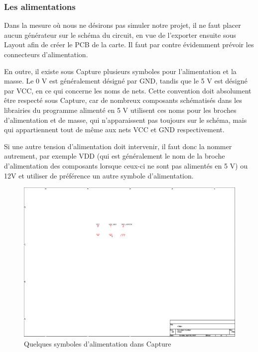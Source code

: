 \documentclass[a4paper]{article}
\begin{document}
\subsubsection{Les alimentations}

Dans la mesure où nous ne désirons pas simuler notre projet, il ne faut placer aucun générateur sur le schéma du circuit, en vue de l'exporter ensuite sous Layout afin de créer le \ac{PCB} de la carte. Il faut par contre évidemment prévoir les connecteurs d'alimentation.

En outre, il existe sous Capture plusieurs symboles pour l'alimentation et la masse. Le 0 V est généralement désigné par GND, tandis que le 5 V est désigné par VCC, en ce qui concerne les noms de nets. Cette convention doit absolument être respecté sous Capture, car de nombreux composants schématisés dans les librairies du programme alimenté en 5 V utilisent ces noms pour les broches d'alimentation et de masse, qui n'apparaissent pas toujours sur le schéma, mais qui appartiennent tout de même aux nets VCC et GND respectivement.

Si une autre tension d'alimentation doit intervenir, il faut donc la nommer autrement, par exemple \og{}VDD\fg{} (qui est généralement le nom de la broche d'alimentation des composants lorsque ceux-ci ne sont pas alimentés en 5 V) ou \og{}12V\fg{} et utiliser de préférence un autre symbole d'alimentation.

\begin{figure}[H]
	\centering
	\includegraphics[scale=1.00]{Images/Symboles_alim_OrCAD}
	\caption{Quelques symboles d'alimentation dans Capture
		\label{Symboles_alim_OrCAD}}
\end{figure}
\end{document}
